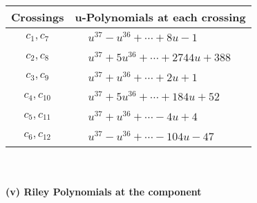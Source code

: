 \documentclass[1p]{elsarticle_modified}
\theoremstyle{definition}
\begin{document}
\begin{tabular}{m{50pt}|m{274pt}}
Crossings & \hspace{64pt}u-Polynomials at each crossing \\
\hline $$\begin{aligned}c_{1},c_{7}\end{aligned}$$&$\begin{aligned}
&u^{37}- u^{36}+\cdots+8 u-1
\end{aligned}$\\
\hline $$\begin{aligned}c_{2},c_{8}\end{aligned}$$&$\begin{aligned}
&u^{37}+5 u^{36}+\cdots+2744 u+388
\end{aligned}$\\
\hline $$\begin{aligned}c_{3},c_{9}\end{aligned}$$&$\begin{aligned}
&u^{37}+u^{36}+\cdots+2 u+1
\end{aligned}$\\
\hline $$\begin{aligned}c_{4},c_{10}\end{aligned}$$&$\begin{aligned}
&u^{37}+5 u^{36}+\cdots+184 u+52
\end{aligned}$\\
\hline $$\begin{aligned}c_{5},c_{11}\end{aligned}$$&$\begin{aligned}
&u^{37}+u^{36}+\cdots-4 u+4
\end{aligned}$\\
\hline $$\begin{aligned}c_{6},c_{12}\end{aligned}$$&$\begin{aligned}
&u^{37}- u^{36}+\cdots-104 u-47
\end{aligned}$\\
\hline
\end{tabular}\\~\\
\newpage\renewcommand{\arraystretch}{1}
\flushleft \textbf{(v) Riley Polynomials at the component}\newline \\
\end{document}
